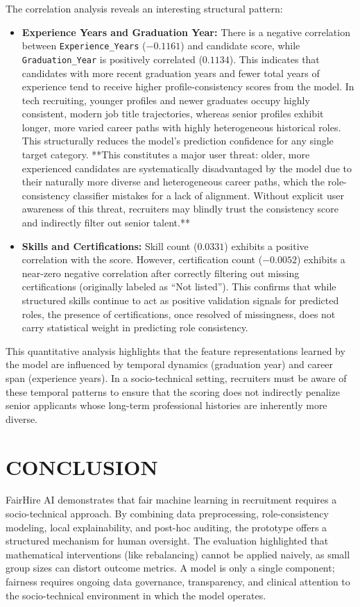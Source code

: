 \documentclass[sigconf]{acmart}
\begin{document}
The correlation analysis reveals an interesting structural pattern:
\begin{itemize}
    \item \textbf{Experience Years and Graduation Year:} There is a negative correlation between \texttt{Experience\_Years} ($-0.1161$) and candidate score, while \texttt{Graduation\_Year} is positively correlated ($0.1134$). This indicates that candidates with more recent graduation years and fewer total years of experience tend to receive higher profile-consistency scores from the model. In tech recruiting, younger profiles and newer graduates occupy highly consistent, modern job title trajectories, whereas senior profiles exhibit longer, more varied career paths with highly heterogeneous historical roles. This structurally reduces the model's prediction confidence for any single target category. **This constitutes a major user threat: older, more experienced candidates are systematically disadvantaged by the model due to their naturally more diverse and heterogeneous career paths, which the role-consistency classifier mistakes for a lack of alignment. Without explicit user awareness of this threat, recruiters may blindly trust the consistency score and indirectly filter out senior talent.**
    \item \textbf{Skills and Certifications:} Skill count ($0.0331$) exhibits a positive correlation with the score. However, certification count ($-0.0052$) exhibits a near-zero negative correlation after correctly filtering out missing certifications (originally labeled as ``Not listed''). This confirms that while structured skills continue to act as positive validation signals for predicted roles, the presence of certifications, once resolved of missingness, does not carry statistical weight in predicting role consistency.
\end{itemize}
This quantitative analysis highlights that the feature representations learned by the model are influenced by temporal dynamics (graduation year) and career span (experience years). In a socio-technical setting, recruiters must be aware of these temporal patterns to ensure that the scoring does not indirectly penalize senior applicants whose long-term professional histories are inherently more diverse.

\section{CONCLUSION}
FairHire AI demonstrates that fair machine learning in recruitment requires a socio-technical approach. By combining data preprocessing, role-consistency modeling, local explainability, and post-hoc auditing, the prototype offers a structured mechanism for human oversight. The evaluation highlighted that mathematical interventions (like rebalancing) cannot be applied naively, as small group sizes can distort outcome metrics. A model is only a single component; fairness requires ongoing data governance, transparency, and clinical attention to the socio-technical environment in which the model operates.
\end{document}

